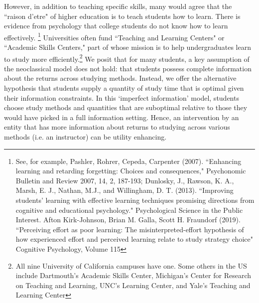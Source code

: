 \documentclass[12pt]{article}
\begin{document}
However, in addition to teaching specific skills, many would agree that the ``raison d'etre" of higher education is to teach students how to learn. There is evidence from psychology that college students do not know how to learn effectively.%
\footnote{See, for example, Pashler, Rohrer, Cepeda, Carpenter (2007). ``Enhancing learning and retarding forgetting: Choices and consequences," Psychonomic Bulletin and Review 2007, 14, 2, 187-193; Dunlosky, J., Rawson, K. A., Marsh, E. J., Nathan, M.J., and Willingham, D. T. (2013). ``Improving students’ learning with effective learning techniques promising directions from cognitive and educational psychology." Psychological Science in the Public Interest. Afton Kirk-Johnson, Brian M. Galla, Scott H. Fraundorf (2019). ``Perceiving effort as poor learning: The misinterpreted-effort hypothesis of how experienced effort and perceived learning relate to study strategy choice" Cognitive Psychology, Volume 115} Universities often fund ``Teaching and Learning Centers" or ``Academic Skills Centers," part of whose mission is to help undergraduates learn to study more efficiently.\footnote{All nine University of California campuses have one. Some others in the US include Dartmouth's Academic Skills Center, Michigan's Center for Research on Teaching and Learning, UNC's Learning Center, and Yale's Teaching and Learning Center} We posit that for many students, a key assumption of the neoclassical model does not hold: that students possess complete information about the returns across studying methods. Instead, we offer the alternative hypothesis that students supply a quantity of study time that is optimal given their information constraints. In this `imperfect information' model, students choose study methods and quantities that are suboptimal relative to those they would have picked in a full information setting. Hence, an intervention by an entity that has more information about returns to studying across various methods (i.e. an instructor) can be utility enhancing.
\end{document}
